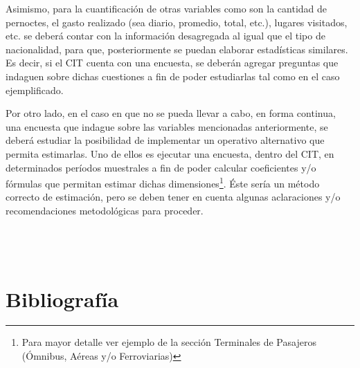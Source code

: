 \documentclass[
]{book}
\begin{document}
Asimismo, para la cuantificación de otras variables como son la cantidad de pernoctes, el gasto realizado (sea diario, promedio, total, etc.), lugares visitados, etc. se deberá contar con la información desagregada al igual que el tipo de nacionalidad, para que, posteriormente se puedan elaborar estadísticas similares. Es decir, si el CIT cuenta con una encuesta, se deberán agregar preguntas que indaguen sobre dichas cuestiones a fin de poder estudiarlas tal como en el caso ejemplificado.

Por otro lado, en el caso en que no se pueda llevar a cabo, en forma continua, una encuesta que indague sobre las variables mencionadas anteriormente, se deberá estudiar la posibilidad de implementar un operativo alternativo que permita estimarlas. Uno de ellos es ejecutar una encuesta, dentro del CIT, en determinados períodos muestrales a fin de poder calcular coeficientes y/o fórmulas que permitan estimar dichas dimensiones\footnote{Para mayor detalle ver ejemplo de la sección Terminales de Pasajeros (Ómnibus, Aéreas y/o Ferroviarias)}. Éste sería un método correcto de estimación, pero se deben tener en cuenta algunas aclaraciones y/o recomendaciones metodológicas para proceder.\\
~\\
~\\
~\\

\hypertarget{bibliografuxeda}{%
\chapter*{\texorpdfstring{\textbf{Bibliografía}}{Bibliografía}}\label{bibliografuxeda}}

  
\end{document}
